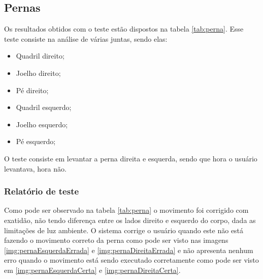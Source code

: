   \subsection{Pernas}\label{sub:perna}
  Os resultados obtidos com o teste estão dispostos na tabela \ref{tab:perna}. Esse teste consiste na análise de várias juntas, sendo elas:
  \begin{itemize}
    \item Quadril direito;
    \item Joelho direito;
    \item Pé direito;
    \item Quadril esquerdo;
    \item Joelho esquerdo;
    \item Pé esquerdo;
  \end{itemize}

  O teste consiste em levantar a perna direita e esquerda, sendo que hora o usuário levantava, hora não.

  \subsubsection{Relatório de teste}\label{sub:perna}
  Como pode ser observado na tabela \ref{tab:perna} o movimento foi corrigido com exatidão, não tendo diferença entre os lados direito e esquerdo do corpo, dada as limitações de luz ambiente. O sistema corrige o usuário quando este
  não está fazendo o movimento correto da perna como pode ser visto nas imagens \ref{img:pernaEsquerdaErrada} e \ref{img:pernaDireitaErrada} e não apresenta nenhum erro quando o movimento está sendo executado
  corretamente como pode ser visto em \ref{img:pernaEsquerdaCerta} e  \ref{img:pernaDireitaCerta}.

